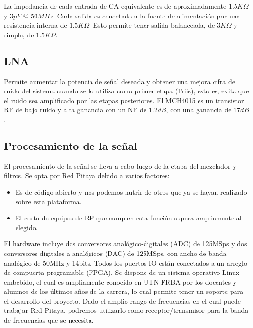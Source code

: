 \documentclass{article}
\begin{document}
La impedancia de cada entrada de CA equivalente es de aproximadamente $1.5K\Omega$ y $3 pF$ @ $50 MHz$. Cada salida es conectado a la fuente de alimentación por una resistencia interna de $1.5 K\Omega$. Esto permite tener salida balanceada, de $3 K\Omega$ y simple, de $1.5 K\Omega$.

\subsection {LNA}

Permite aumentar la potencia de señal deseada y obtener una mejora cifra de ruido del sistema cuando se lo utiliza como primer etapa (Friis), esto es, evita que el ruido sea amplificado por las etapas posteriores.
El MCH4015 es un transistor RF de bajo ruido y alta ganancia con un NF de $1.2 dB$, con una ganancia de $17 dB$.


\subsection{Procesamiento de la señal}

El procesamiento de la señal se lleva a cabo luego de la etapa del mezclador y filtros. Se opta por Red Pitaya debido a varios factores:
\begin{itemize}
    \item Es de código abierto y nos podemos nutrir de otros que ya se hayan realizado sobre esta plataforma.
    \item El costo de equipos de RF que cumplen esta función supera ampliamente al elegido.
\end{itemize}
El hardware incluye dos conversores analógico-digitales (ADC) de 125MSps y dos conversores digitales a analógicos (DAC) de 125MSps, con ancho de banda analógico de 50MHz y 14bits. Todos los puertos IO están conectados a un arreglo de compuerta programable (FPGA).
Se dispone de un sistema operativo Linux embebido, el cual es ampliamente conocido en UTN-FRBA por los docentes y alumnos de los últimos años de la carrera, lo cual permite tener un soporte para el desarrollo del proyecto. 
Dado el amplio rango de frecuencias en el cual puede trabajar Red Pitaya, podremos utilizarlo como receptor/transmisor para la banda de frecuencias que se necesita.
\end{document}
